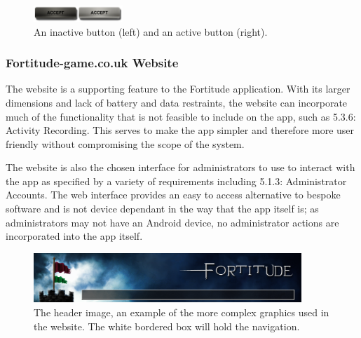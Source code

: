 \begin{figure}[ht]
	\vspace{-10pt}
	\begin{center}
	\includegraphics[width=0.3\textwidth]{images/buttons}
	\vspace{-10pt}
	\caption{An inactive button (left) and an active button (right).}
	\label{buttons}
	\end{center}
\end{figure}

\subsubsection{Fortitude-game.co.uk Website}

The website is a supporting feature to the Fortitude application. With its larger dimensions and lack of battery and data restraints, the website can incorporate much of the functionality that is not feasible to include on the app, such as 5.3.6: Activity Recording. This serves to make the app simpler and therefore more user friendly without compromising the scope of the system.

The website is also the chosen interface for administrators to use to interact with the app as specified by a variety of requirements including 5.1.3: Administrator Accounts. The web interface provides an easy to access alternative to bespoke software and is not device dependant in the way that the app itself is; as administrators may not have an Android device, no administrator actions are incorporated into the app itself.

\begin{figure}[ht]
	\begin{center}
	\includegraphics[width=0.9\textwidth]{images/website_header_background}
	\caption{The header image, an example of the more complex graphics used in the website. The white bordered box will hold the navigation.}
	\label{website_header_background}
	\end{center}
	\vspace{-20pt}
\end{figure}

